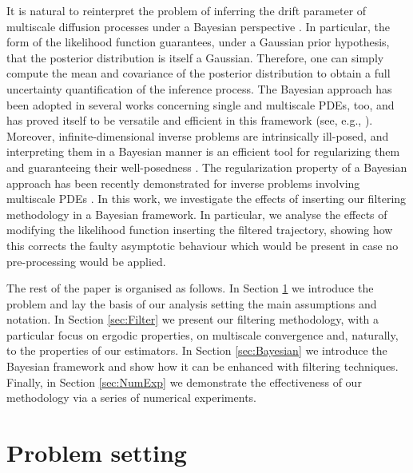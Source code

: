 \documentclass[10pt]{article}
\begin{document}
It is natural to reinterpret the problem of inferring the drift parameter of multiscale diffusion processes under a Bayesian perspective \cite{PSV09,PSZ13}. In particular, the form of the likelihood function guarantees, under a Gaussian prior hypothesis, that the posterior distribution is itself a Gaussian. Therefore, one can simply compute the mean and covariance of the posterior distribution to obtain a full uncertainty quantification of the inference process. The Bayesian approach has been adopted in several works concerning single and multiscale PDEs, too, and has proved itself to be versatile and efficient in this framework (see, e.g., \cite{AbD18, AGZ19}). Moreover, infinite-dimensional inverse problems are intrinsically ill-posed, and interpreting them in a Bayesian manner is an efficient tool for regularizing them and guaranteeing their well-posedness \cite{Stu10, DaS16}. The regularization property of a Bayesian approach has been recently demonstrated for inverse problems involving multiscale PDEs \cite{AbD18}. In this work, we investigate the effects of inserting our filtering methodology in a Bayesian framework. In particular, we analyse the effects of modifying the likelihood function inserting the filtered trajectory, showing how this corrects the faulty asymptotic behaviour which would be present in case no pre-processing would be applied.

The rest of the paper is organised as follows. In Section \ref{sec:Setting} we introduce the problem and lay the basis of our analysis setting the main assumptions and notation. In Section \ref{sec:Filter} we present our filtering methodology, with a particular focus on ergodic properties, on multiscale convergence and, naturally, to the properties of our estimators. In Section \ref{sec:Bayesian} we introduce the Bayesian framework and show how it can be enhanced with filtering techniques. Finally, in Section \ref{sec:NumExp} we demonstrate the effectiveness of our methodology via a series of numerical experiments.

\section{Problem setting}\label{sec:Setting}
\end{document}
